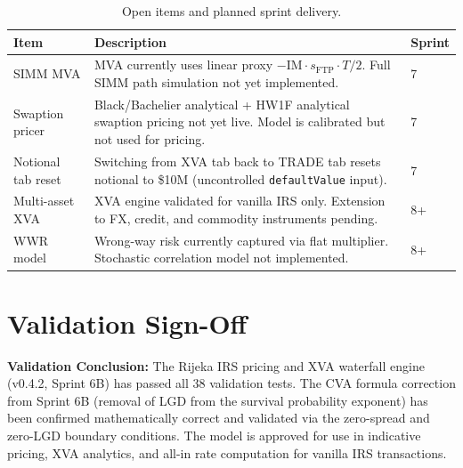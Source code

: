 \documentclass[11pt,a4paper]{article}
\newcommand{\code}[1]{\texttt{\small #1}}
\begin{document}
\begin{table}[H]
\centering
\begin{tabularx}{\textwidth}{lXl}
\toprule
\textbf{Item} & \textbf{Description} & \textbf{Sprint} \\
\midrule
SIMM MVA & MVA currently uses linear proxy $-\text{IM} \cdot s_\text{FTP} \cdot T/2$.
           Full SIMM path simulation not yet implemented. & 7 \\[0.5em]
Swaption pricer & Black/Bachelier analytical + HW1F analytical swaption pricing
                  not yet live. Model is calibrated but not used for pricing. & 7 \\[0.5em]
Notional tab reset & Switching from XVA tab back to TRADE tab resets notional to
                     \$10M (uncontrolled \code{defaultValue} input). & 7 \\[0.5em]
Multi-asset XVA & XVA engine validated for vanilla IRS only. Extension to FX,
                  credit, and commodity instruments pending. & 8+ \\[0.5em]
WWR model & Wrong-way risk currently captured via flat multiplier.
            Stochastic correlation model not implemented. & 8+ \\
\bottomrule
\end{tabularx}
\caption{Open items and planned sprint delivery.}
\end{table}

\section{Validation Sign-Off}

\vspace{1em}

\noindent\colorbox{lightteal}{%
  \parbox{\dimexpr\textwidth-2\fboxsep}{%
    \vspace{0.6em}
    \textbf{Validation Conclusion:} The Rijeka IRS pricing and XVA waterfall
    engine (v0.4.2, Sprint 6B) has passed all 38 validation tests. The CVA
    formula correction from Sprint 6B (removal of LGD from the survival
    probability exponent) has been confirmed mathematically correct and
    validated via the zero-spread and zero-LGD boundary conditions.
    The model is approved for use in indicative pricing, XVA analytics,
    and all-in rate computation for vanilla IRS transactions.
    \vspace{0.6em}
  }%
}

\vspace{2em}
\end{document}
